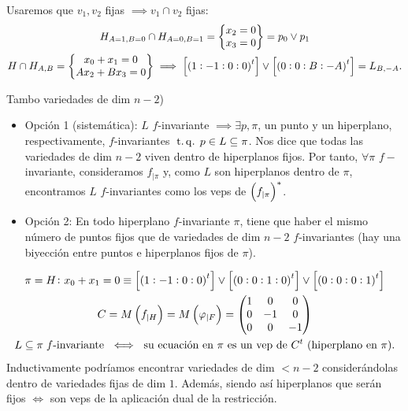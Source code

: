 \begin{example}
\begin{itemize}
        Usaremos que $v_1, v_2$ fijas $\implies v_1 \cap v_2$ fijas:
        \begin{gather*}
            H_{A=1,B=0} \cap H_{A=0,B=1} = \begin{Bmatrix}
                x_2 = 0 \\
                x_3 = 0
            \end{Bmatrix} = p_0 \vee p_1 \\
            H \cap H_{A,B} = \begin{Bmatrix}
                x_0 + x_1 = 0 \\
                Ax_2 + Bx_3 = 0
            \end{Bmatrix} \implies \left[\left(1:-1:0:0\right)^t\right] \vee \left[\left(0:0:B:-A\right)^t\right] = L_{B,-A}.
        \end{gather*}
    \end{itemize}
\end{example}
\begin{obs}
    Tambo variedades de dim $n-2$)
    \begin{itemize}
        \item Opción 1 (sistemática): $L$ $f$-invariante $\implies \exists p,\pi$, un punto y un hiperplano, respectivamente, $f$-invariantes $\operatorname{\;t.q.\;} p\in L\subseteq\pi$. Nos dice que todas las variedades de dim $n-2$ viven dentro de hiperplanos fijos. Por tanto, $\forall \pi$ $f-$invariante, consideramos $f_{|\pi}$ y, como $L$ son hiperplanos dentro de $\pi$, encontramos $L$ $f$-invariantes como los veps de $\left( f_{|\pi}\right)^*$.
        \item Opción 2: En todo hiperplano $f$-invariante $\pi$, tiene que haber el mismo número de puntos fijos que de variedades de dim $n-2$ $f$-invariantes (hay una biyección entre puntos e hiperplanos fijos de $\pi$).
    \end{itemize}
\end{obs}
\begin{example}
    \begin{gather*}
        \pi = H \colon x_0 + x_1 = 0 \equiv \left[\left(1:-1:0:0\right)^t\right] \vee \left[\left(0:0:1:0\right)^t\right] \vee \left[\left(0:0:0:1\right)^t\right] \\
        C = M\left( f_{|H}\right) = M\left(\varphi_{|F}\right) =
        \begin{pmatrix}
            1 & 0 & 0 \\
            0 & -1 & 0 \\
            0 & 0 & -1
        \end{pmatrix} \\
        L \subseteq \pi\;f\text{-invariante }\iff\text{ su ecuación en }\pi\text{ es un vep de }C^t\text{ (hiperplano en }\pi\text{).}
    \end{gather*}
    Inductivamente podríamos encontrar variedades de dim $< n-2$ considerándolas dentro de variedades fijas de dim $1$. Además, siendo así hiperplanos que serán fijos $\iff$ son veps de la aplicación dual de la restricción.
\end{example}
